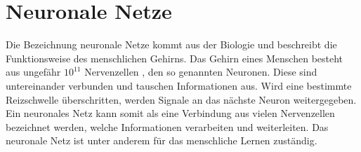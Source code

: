 \documentclass[a4paper,12pt,oneside]{article}
\begin{document}
\section{Neuronale Netze}  
Die Bezeichnung \glqq neuronale Netze\grqq{} kommt aus der Biologie und beschreibt die Funktionsweise des menschlichen Gehirns. Das Gehirn eines Menschen besteht aus ungefähr $10^{11}$ Nervenzellen \cite[265ff.]{ertel2013grundkurs}, den so genannten Neuronen. Diese sind untereinander verbunden und tauschen Informationen aus. Wird eine bestimmte Reizschwelle überschritten, werden Signale an das nächste Neuron weitergegeben. Ein neuronales Netz kann somit als eine Verbindung aus vielen Nervenzellen bezeichnet werden, welche Informationen verarbeiten und weiterleiten. Das neuronale Netz ist unter anderem für das menschliche Lernen zuständig. 
\end{document}
